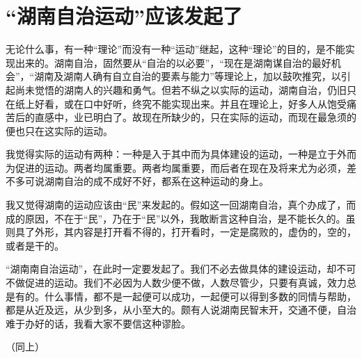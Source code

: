 \section{“湖南自治运动”应该发起了}



无论什么事，有一种“理论”而没有一种“运动”继起，这种“理论”的目的，是不能实现出来的。湖南自治，固然要从“自治的以必要”，“现在是湖南谋自治的最好机会”，“湖南及湖南人确有自立自治的要素与能力”等理论上，加以鼓吹推究，以引起尚未觉悟的湖南人的兴趣和勇气。但若不纵之以实际的运动，湖南自治，仍旧只在纸上好看，或在口中好听，终究不能实现出来。并且在理论上，好多人从饱受痛苦后的直感中，业已明白了。故现在所缺少的，只在实际的运动，而现在最急须的便也只在这实际的运动。

我觉得实际的运动有两种：一种是入于其中而为具体建设的运动，一种是立于外而为促进的运动。两者均属重要。两者均属重要，而后者在现在及将来尤为必须，差不多可说湖南自治的成不成好不好，都系在这种运动的身上。

我又觉得湖南的运动应该由“民”来发起的。假如这一回湖南自治，真个办成了，而成的原因，不在于“民”，乃在于“民”以外，我敢断言这种自治，是不能长久的。虽则具了外形，其内容是打开看不得的，打开看时，一定是腐败的，虚伪的，空的，或者是干的。

“湖南南自治运动”，在此时一定要发起了。我们不必去做具体的建设运动，却不可不做促进的运动。我们不必因为人数少便不做，人数尽管少，只要有真诚，效力总是有的。什么事情，都不是一起便可以成功，一起便可以得到多数的同情与帮助，都是从近及远，从少到多，从小至大的。颇有人说湖南民智末开，交通不便，自治难于办好的话，我看大家不要信这种谬脸。

（同上）

